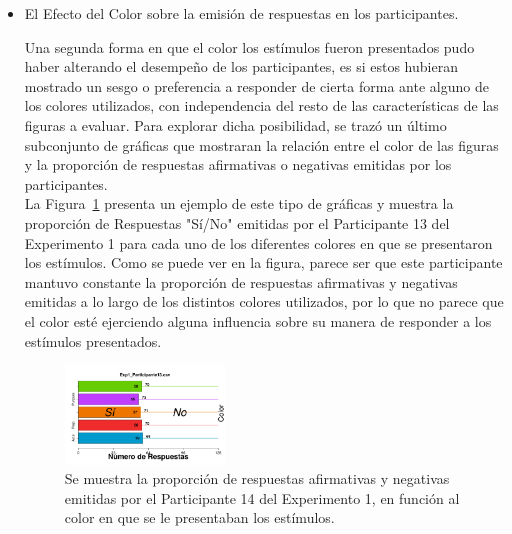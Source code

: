 \begin{itemize}
\item El Efecto del Color sobre la emisión de respuestas en los participantes.

Una segunda forma en que el color los estímulos fueron presentados pudo haber alterando el desempeño de los participantes, es si estos hubieran mostrado un sesgo o preferencia a responder de cierta forma ante alguno de los colores utilizados, con independencia del resto de las características de las figuras a evaluar. Para explorar dicha posibilidad, se trazó un último subconjunto de gráficas que mostraran la relación entre el color de las figuras y la proporción de respuestas afirmativas o negativas emitidas por los participantes.\\

La Figura~\ref{fig:BiasCol_E1_P13} presenta un ejemplo de este tipo de gráficas y muestra la proporción de Respuestas "Sí/No" emitidas por el Participante 13 del Experimento 1 para cada uno de los diferentes colores en que se presentaron los estímulos. Como se puede ver en la figura, parece ser que este participante mantuvo constante la proporción de respuestas afirmativas y negativas emitidas a lo largo de los distintos colores utilizados, por lo que no parece que el color esté ejerciendo alguna influencia sobre su manera de responder a los estímulos presentados.\\

\begin{figure}[th]
\centering
\includegraphics[width=0.40\textwidth]{Figures/BiasColor_Exp1_P13}
\caption[Proporción de Respuestas "Sí/No" por color; Ejemplo]{Se muestra la proporción de respuestas afirmativas y negativas emitidas por el Participante 14 del Experimento 1, en función al color en que se le presentaban los estímulos.}
\label{fig:BiasCol_E1_P13}
\end{figure}


\end{itemize}

